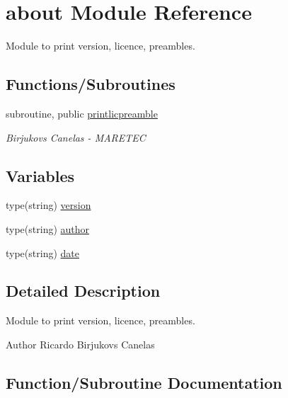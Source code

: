 \hypertarget{namespaceabout}{}\section{about Module Reference}
\label{namespaceabout}


Module to print version, licence, preambles.  


\subsection*{Functions/\+Subroutines}
\begin{DoxyCompactItemize}
\item 
subroutine, public \mbox{\hyperlink{namespaceabout_aca93132913ea2de3a9eb9aa3d1c0ec9c}{printlicpreamble}}
\begin{DoxyCompactList}\small\item\em Birjukovs Canelas -\/ M\+A\+R\+E\+T\+EC \end{DoxyCompactList}\end{DoxyCompactItemize}
\subsection*{Variables}
\begin{DoxyCompactItemize}
\item 
type(string) \mbox{\hyperlink{namespaceabout_a14ee014ae64ebcd65e04112f51ca7911}{version}}
\item 
type(string) \mbox{\hyperlink{namespaceabout_a157e082adf984f1d88804d2f8217a632}{author}}
\item 
type(string) \mbox{\hyperlink{namespaceabout_a24578effbdb161e41c0b52f50e7e3ffc}{date}}
\end{DoxyCompactItemize}


\subsection{Detailed Description}
Module to print version, licence, preambles. 

\begin{DoxyAuthor}{Author}
Ricardo Birjukovs Canelas 
\end{DoxyAuthor}


\subsection{Function/\+Subroutine Documentation}
\mbox{\label{namespaceabout_aca93132913ea2de3a9eb9aa3d1c0ec9c}} 
